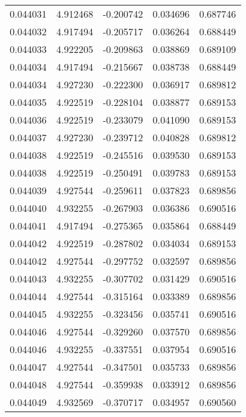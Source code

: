\begin{tabular}{lrrrr}
0.044031    &  4.912468 & -0.200742 &  0.034696 &             0.687746 \\
0.044032    &  4.917494 & -0.205717 &  0.036264 &             0.688449 \\
0.044033    &  4.922205 & -0.209863 &  0.038869 &             0.689109 \\
0.044034    &  4.917494 & -0.215667 &  0.038738 &             0.688449 \\
0.044034    &  4.927230 & -0.222300 &  0.036917 &             0.689812 \\
0.044035    &  4.922519 & -0.228104 &  0.038877 &             0.689153 \\
0.044036    &  4.922519 & -0.233079 &  0.041090 &             0.689153 \\
0.044037    &  4.927230 & -0.239712 &  0.040828 &             0.689812 \\
0.044038    &  4.922519 & -0.245516 &  0.039530 &             0.689153 \\
0.044038    &  4.922519 & -0.250491 &  0.039783 &             0.689153 \\
0.044039    &  4.927544 & -0.259611 &  0.037823 &             0.689856 \\
0.044040    &  4.932255 & -0.267903 &  0.036386 &             0.690516 \\
0.044041    &  4.917494 & -0.275365 &  0.035864 &             0.688449 \\
0.044042    &  4.922519 & -0.287802 &  0.034034 &             0.689153 \\
0.044042    &  4.927544 & -0.297752 &  0.032597 &             0.689856 \\
0.044043    &  4.932255 & -0.307702 &  0.031429 &             0.690516 \\
0.044044    &  4.927544 & -0.315164 &  0.033389 &             0.689856 \\
0.044045    &  4.932255 & -0.323456 &  0.035741 &             0.690516 \\
0.044046    &  4.927544 & -0.329260 &  0.037570 &             0.689856 \\
0.044046    &  4.932255 & -0.337551 &  0.037954 &             0.690516 \\
0.044047    &  4.927544 & -0.347501 &  0.035733 &             0.689856 \\
0.044048    &  4.927544 & -0.359938 &  0.033912 &             0.689856 \\
0.044049    &  4.932569 & -0.370717 &  0.034957 &             0.690560 \\

\end{tabular}
